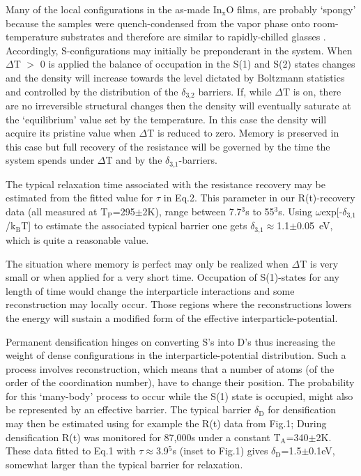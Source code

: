 \documentclass
[preprint,showpacs,byrevtex,10pt,twocolumn,tightenlines,prl,letterpaper]{revtex4}%
\begin{document}
Many of the local configurations in the as-made In$_{\text{x}}$O films, are
probably `spongy' because the samples were quench-condensed from the vapor
phase onto room-temperature substrates and therefore are similar to
rapidly-chilled glasses \cite{1}. Accordingly, S-configurations may initially
be preponderant in the system. When $\Delta$T%
$>$%
0 is applied the balance of occupation in the S(1) and S(2) states changes and
the density will increase towards the level dictated by Boltzmann statistics
and controlled by the distribution of the $\delta_{\text{3,2}}$ barriers. If,
while $\Delta$T is on, {\small t}here are no irreversible structural changes
then the density will eventually saturate at the `equilibrium' value set by
the temperature. In this case the density will acquire its pristine value when
$\Delta$T is reduced to zero. Memory is preserved in this case but full
recovery of the resistance will be governed by the time the system spends
under $\Delta$T and by the $\delta_{\text{3,1}}$-barriers.

The typical relaxation time associated with the resistance recovery may be
estimated from the fitted value for $\tau$ in Eq.2. This parameter in our
R(t)-recovery data (all measured at T$_{\text{P}}$=295$\pm$2K), range between
7.7$^{\text{3}}$s to 55$^{\text{3}}%
$s. Using $\omega$\textperiodcentered exp[-$\delta_{\text{3,1}}$/k$_{\text{B}%
}$T] to estimate the associated typical barrier one gets $\delta_{\text{3,1}%
}\approx$1.1$\pm$0.05~eV, which is quite a reasonable value.

The situation where memory is perfect may only be realized when $\Delta$T is
very small or when applied for a very short time. Occupation of S(1)-states
for any length of time would change the interparticle interactions and some
reconstruction may locally occur. Those regions where the reconstructions
lowers the energy will sustain a modified form of the effective interparticle-potential.

Permanent densification hinges on converting S's into D's thus increasing the
weight of dense configurations in the interparticle-potential distribution.
Such a process involves reconstruction, which means that a number of atoms (of
the order of the coordination number), have to change their position. The
probability for this `many-body' process to occur while the S(1) state is
occupied, might also be represented by an effective barrier. The typical
barrier $\delta_{\text{D}}$ for densification may then be estimated using for
example the R(t) data from Fig.1; During densification R(t) was monitored for
87,000s under a constant T$_{\text{A}}$=340$\pm$2K. These data fitted to Eq.1
with $\tau\approx$3.9$^{\text{5}}$s (inset to Fig.1)
gives $\delta_{\text{D}}$=1.5$\pm$0.1eV, somewhat larger than the typical
barrier for relaxation.
\end{document}
